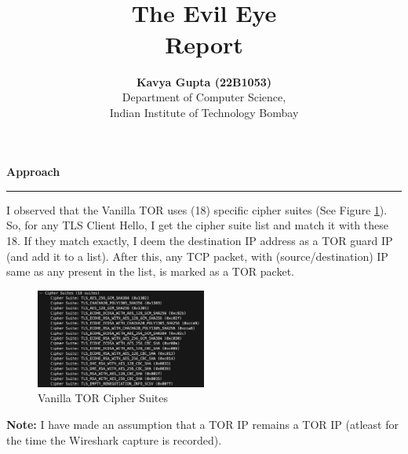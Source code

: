 \documentclass[a4paper,12pt]{article}
\title{\cooltitle{CS790 Assignment 2} \\
\LARGE \textbf{The Evil Eye} \\
Report}
\author{{\bf Kavya Gupta (22B1053)} \\
\small Department of Computer Science, \\
Indian Institute of Technology Bombay \\}
\date{}
\newenvironment{solution}[2][]{%
\begin{mdframed}[linecolor=blue!70!black, linewidth=2pt, roundcorner=10pt, backgroundcolor=yellow!10!white, skipabove=12pt, skipbelow=12pt]%
	\textbf{\large #2}
	\par\noindent\rule{\textwidth}{0.4pt}
}{
\end{mdframed}
}
\begin{document}
\maketitle

\begin{solution}{Approach}
I observed that the Vanilla TOR uses (18) specific cipher suites (See Figure \ref{cipher-suites}). So, for any TLS Client Hello, I get the cipher suite list and match it with these 18. If they match exactly, I deem the destination IP address as a TOR guard IP (and add it to a list). After this, any TCP packet, with (source/destination) IP same as any present in the list, is marked as a TOR packet.
\begin{figure}[H]
    \centering
    \includegraphics[width=0.5\textwidth]{cipher-suites.png}
    \caption{Vanilla TOR Cipher Suites}\label{cipher-suites}
\end{figure}
\textbf{Note:} I have made an assumption that a TOR IP remains a TOR IP (atleast for the time the Wireshark capture is recorded).
\end{solution}
\end{document}
